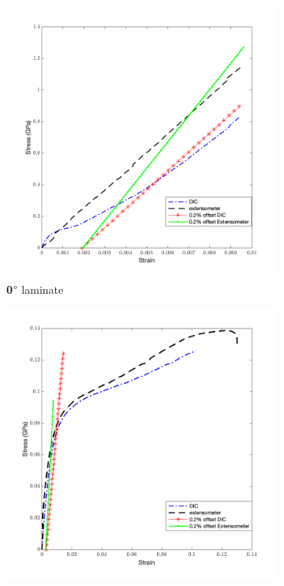 \begin{figure}[!h]
    \begin{center}
    \begin{subfigure}[b]{0.45\linewidth}
        \centering
        \includegraphics[width=\linewidth]{Pictures/stress vs strain/StressvsStrain_0.png}
        \caption{\textbf 0$\degree$ laminate}
        \label{fig:0lam}
    \end{subfigure}
    \begin{subfigure}[b]{0.45\linewidth}
        \centering
        \includegraphics[width=\linewidth]{Pictures/stress vs strain/StressvsStrain_45.png}

\end{subfigure}
\end{center}
\end{figure}
